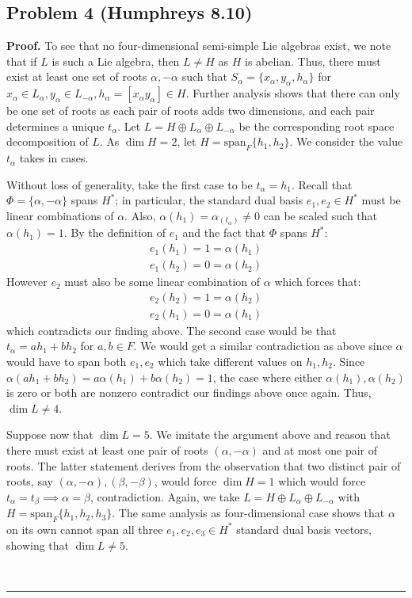 \documentclass[12pt]{article}%
\newenvironment{proof}[1][Proof]{\textbf{#1.} }{\ \rule{0.5em}{0.5em}}
\begin{document}
\subsection*{Problem 4 (Humphreys 8.10)}
\begin{proof}
  To see that no four-dimensional semi-simple Lie algebras exist, we note that if $L$ is such a Lie algebra, then $L \neq H$ as $H$ is abelian. Thus, there must exist at least one set of roots $\alpha,-\alpha$ such that $S_{\alpha} = \{x_{\alpha},y_{\alpha},h_{\alpha}\}$ for $x_{\alpha} \in L_{\alpha}, y_{\alpha} \in L_{-\alpha}, h_{\alpha} = [x_{\alpha}y_{\alpha}] \in H$. Further analysis shows that there can only be one set of roots as each pair of roots adds two dimensions, and each pair determines a unique $t_{\alpha}$. Let $L = H \oplus L_{\alpha} \oplus L_{-\alpha}$ be the corresponding root space decomposition of $L$. As $\dim H = 2$, let $H = \text{span}_F\{h_1,h_2\}$. We consider the value $t_{\alpha}$ takes in cases.

  Without loss of generality, take the first case to be $t_{\alpha} = h_1$. Recall that $\Phi = \{\alpha,-\alpha\}$ spans $H^*$; in particular, the standard dual basis $e_1,e_2 \in H^*$ must be linear combinations of $\alpha$. Also, $\alpha(h_1) = \alpha_(t_{\alpha}) \neq 0$ can be scaled such that $\alpha(h_1) = 1$. By the definition of $e_1$ and the fact that $\Phi$ spans $H^*$:
  \begin{gather*}
   e_1(h_1) = 1 = \alpha(h_1) \\
   e_1(h_2) = 0 = \alpha(h_2)
 \end{gather*}
 However $e_2$ must also be some linear combination of $\alpha$ which forces that:
 \begin{gather*}
   e_2(h_2) = 1 = \alpha(h_2) \\
   e_2(h_1) = 0 = \alpha(h_1)
 \end{gather*}
 which contradicts our finding above.
 The second case would be that $t_{\alpha} = ah_1 + bh_2$ for $a,b \in F$. We would get a similar contradiction as above since $\alpha$ would have to span both $e_1,e_2$ which take different values on $h_1,h_2$. Since $\alpha(ah_1 + bh_2) = a \alpha(h_1) + b\alpha(h_2) = 1$, the case where either $\alpha(h_1),\alpha(h_2)$ is zero or both are nonzero contradict our findings above once again. Thus, $\dim L \neq 4$.


 Suppose now that $\dim L = 5$. We imitate the argument above and reason that there must exist at least one pair of roots $(\alpha,-\alpha)$ and at most one pair of roots. The latter statement derives from the observation that two distinct pair of roots, say $(\alpha,-\alpha),(\beta,-\beta)$, would force $\dim H = 1$ which would force $t_{\alpha} = t_{\beta} \implies \alpha = \beta$, contradiction.
 Again, we take $L = H \oplus L_{\alpha} \oplus L_{-\alpha}$ with $H = \text{span}_F\{h_1,h_2,h_3\}$. The same analysis as four-dimensional case shows that $\alpha$ on its own cannot span all three $e_1,e_2,e_3 \in H^*$ standard dual basis vectors, showing that $\dim L \neq 5$.


\end{proof}
\end{document}
